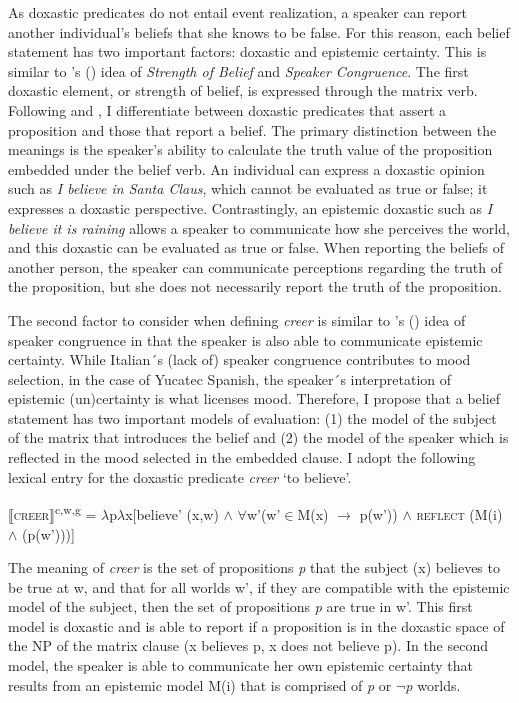 \documentclass[output=paper,colorlinks,citecolor=brown,
]{langscibook}
\begin{document}
As doxastic predicates do not entail event realization, a speaker can report another individual's beliefs that she knows to be false. For this reason, each belief statement has two important factors: doxastic and epistemic certainty. This is similar to \citeauthor{Homer2007}'s (\citeyear{Homer2007}) idea of \textit{Strength of Belief }and \textit{Speaker Congruence}. The first doxastic element, or strength of belief, is expressed through the matrix verb. Following \citet{AnandHacquard2014} and \citet{Mari2016}, I differentiate between doxastic predicates that assert a proposition and those that report a belief. The primary distinction between the meanings is the speaker's ability to calculate the truth value of the proposition embedded under the belief verb. An individual can express a doxastic opinion such as \textit{I believe in Santa Claus}, which cannot be evaluated as true or false; it expresses a doxastic perspective. Contrastingly, an epistemic doxastic such as \textit{I believe it is raining }allows a speaker to communicate how she perceives the world, and this doxastic can be evaluated as true or false. When reporting the beliefs of another person, the speaker can communicate perceptions regarding the truth of the proposition, but she does not necessarily report the truth of the proposition. 

The second factor to consider when defining \textit{creer }is similar to \citeauthor{Homer2007}'s (\citeyear{Homer2007}) idea of speaker congruence in that the speaker is also able to communicate epistemic certainty. While Italian´s (lack of) speaker congruence contributes to mood selection, in the case of Yucatec Spanish, the speaker´s interpretation of epistemic (un)certainty is what licenses mood. Therefore, I propose that a belief statement has two important models of evaluation: (1) the model of the subject of the matrix that introduces the belief and (2) the model of the speaker which is reflected in the mood selected in the embedded clause. I adopt the following lexical entry for the doxastic predicate \textit{creer }`to believe'.

\begin{exe}
    \ex\label{ex:bove:21}
     ⟦\textsc{creer}⟧\textsuperscript{c,w,g} =  $\lambda$p$\lambda$x[believe' (x,w) ${\wedge}$ ${\forall}$w'(w'${\in}$M(x) $\rightarrow$ p(w')) ${\wedge}$ \textsc{reflect} (M(i) ${\wedge}$ (p(w')))]
\end{exe}



The meaning of \textit{creer} is the set of propositions \textit{p }that the subject (x) believes to be true at w, and that for all worlds w', if they are compatible with the epistemic model of the subject, then the set of propositions \textit{p }are true in w'. This first model is doxastic and is able to report if a proposition is in the doxastic space of the NP of the matrix clause (x believes p, x does not believe p). In the second model, the speaker is able to communicate her own epistemic certainty that results from an epistemic model M(i) that is comprised of \textit{p} or $\neg$\textit{p} worlds. 
\end{document}
